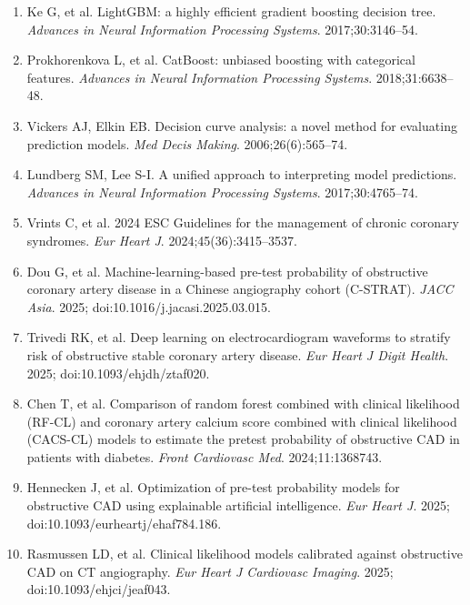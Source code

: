 \documentclass[english,11pt]{article}
\begin{document}
\begin{enumerate}
\item Ke G, et al. LightGBM: a highly efficient gradient boosting decision tree. \emph{Advances in Neural Information Processing Systems}. 2017;30:3146--54.
\item Prokhorenkova L, et al. CatBoost: unbiased boosting with categorical features. \emph{Advances in Neural Information Processing Systems}. 2018;31:6638--48.
\item Vickers AJ, Elkin EB. Decision curve analysis: a novel method for evaluating prediction models. \emph{Med Decis Making}. 2006;26(6):565--74.
\item Lundberg SM, Lee S-I. A unified approach to interpreting model predictions. \emph{Advances in Neural Information Processing Systems}. 2017;30:4765--74.
\item Vrints C, et al. 2024 ESC Guidelines for the management of chronic coronary syndromes. \emph{Eur Heart J}. 2024;45(36):3415--3537.
\item Dou G, et al. Machine-learning-based pre-test probability of obstructive coronary artery disease in a Chinese angiography cohort (C-STRAT). \emph{JACC Asia}. 2025; doi:10.1016/j.jacasi.2025.03.015.
\item Trivedi RK, et al. Deep learning on electrocardiogram waveforms to stratify risk of obstructive stable coronary artery disease. \emph{Eur Heart J Digit Health}. 2025; doi:10.1093/ehjdh/ztaf020.
\item Chen T, et al. Comparison of random forest combined with clinical likelihood (RF-CL) and coronary artery calcium score combined with clinical likelihood (CACS-CL) models to estimate the pretest probability of obstructive CAD in patients with diabetes. \emph{Front Cardiovasc Med}. 2024;11:1368743.
\item Hennecken J, et al. Optimization of pre-test probability models for obstructive CAD using explainable artificial intelligence. \emph{Eur Heart J}. 2025; doi:10.1093/eurheartj/ehaf784.186.
\item Rasmussen LD, et al. Clinical likelihood models calibrated against obstructive CAD on CT angiography. \emph{Eur Heart J Cardiovasc Imaging}. 2025; doi:10.1093/ehjci/jeaf043.
\end{enumerate}
\end{document}
